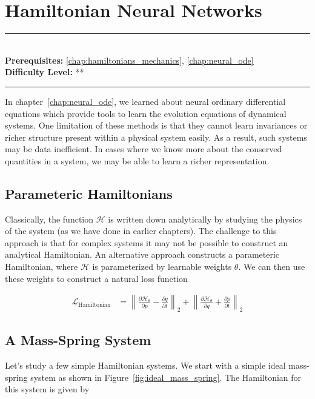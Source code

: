 \documentclass[book.tex]{subfiles}
\begin{document}
\chapter{Hamiltonian Neural Networks}
\label{chap:hamiltonian_nn}
\noindent\rule{11cm}{0.4pt} \\
\textbf{Prerequisites:} \autoref{chap:hamiltonians_mechanics}, \autoref{chap:neural_ode} \\
\textbf{Difficulty Level:} ** \\
\noindent\rule{11cm}{0.4pt}
\vspace{5mm}

In chapter~\ref{chap:neural_ode}, we learned about neural ordinary differential equations which provide tools to learn the evolution equations of dynamical systems. One limitation of these methods is that they cannot learn invariances or richer structure present within a physical system easily. As a result, such systems may be data inefficient. In cases where we know more about the conserved quantities in a system, we may be able to learn a richer representation.


\section{Parameteric Hamiltonians}

Classically, the function $\mathcal{H}$ is written down analytically by studying the physics of the system (as we have done in earlier chapters). The challenge to this approach is that for complex systems it may not be possible to construct an analytical Hamiltonian. An alternative approach constructs a parameteric Hamiltonian, where $\mathcal{H}$ is parameterized by learnable weights $\theta$. We can then use these weights to construct a natural loss function

\begin{align}
    \mathcal{L}_{\textrm{Hamiltonian}} &= \left \| \frac{\partial \mathcal{H}_{\theta}}{\partial p} - \frac{\partial q}{\partial t}\right \|_2
    +
    \left \|\frac{\partial \mathcal{H}_{\theta}}{\partial q} + \frac{\partial p}{\partial t}\right \|_2
\end{align}

\section{A Mass-Spring System}

Let's study a few simple Hamiltonian systems. We start with a simple ideal mass-spring system as shown in Figure~\ref{fig:ideal_mass_spring}. The Hamiltonian for this system is given by
\end{document}
